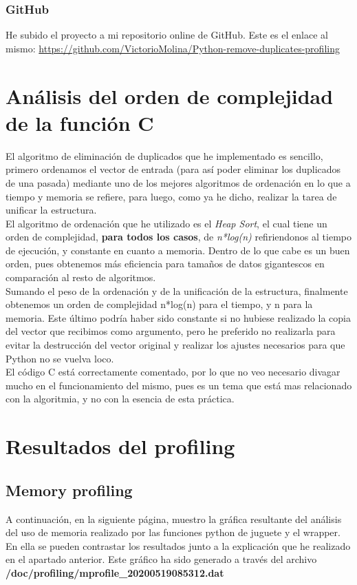 \documentclass[12 pt]{article}
\begin{document}
\subsubsection{GitHub}
He subido el proyecto a mi repositorio online de GitHub. Este es el enlace al mismo: \href{https://github.com/VictorioMolina/Python-remove-duplicates-profiling}{https://github.com/VictorioMolina/Python-remove-duplicates-profiling}

\section{Análisis del orden de complejidad de la función C}

El algoritmo de eliminación de duplicados que he implementado es sencillo, primero ordenamos el vector de entrada (para así poder eliminar los duplicados de una pasada) mediante uno de los mejores algoritmos de ordenación en lo que a tiempo y memoria se refiere, para luego, como ya he dicho, realizar la tarea de unificar la estructura.\\

El algoritmo de ordenación que he utilizado es el \emph{Heap Sort}, el cual tiene un orden de complejidad, \textbf{para todos los casos}, de \textit{n*log(n)} refiriendonos al tiempo de ejecución, y constante en cuanto a memoria. Dentro de lo que cabe es un buen orden, pues obtenemos más eficiencia para tamaños de datos gigantescos en comparación al resto de algoritmos.\\

Sumando el peso de la ordenación y de la unificación de la estructura, finalmente obtenemos un orden de complejidad n*log(n) para el tiempo, y n para la memoria. Este último podría haber sido constante si no hubiese realizado la copia del vector que recibimos como argumento, pero he preferido no realizarla para evitar la destrucción del vector original y realizar los ajustes necesarios para que Python no se vuelva loco.\\

El código C está correctamente comentado, por lo que no veo necesario divagar mucho en el funcionamiento del mismo, pues es un tema que está mas relacionado con la algoritmia, y no con la esencia de esta práctica.

\section{Resultados del profiling}
\subsection{Memory profiling}
A continuación, en la siguiente página, muestro la gráfica resultante del análisis del uso de memoria realizado por las funciones python de juguete y el wrapper. En ella se pueden contrastar los resultados junto a la explicación que he realizado en el apartado anterior. Este gráfico ha sido generado a través del archivo  \textbf{/doc/profiling/mprofile\_20200519085312.dat}
\end{document}
